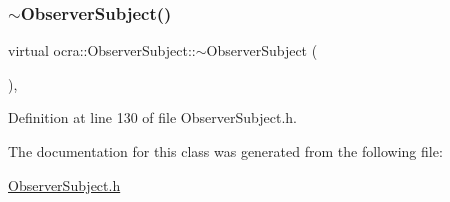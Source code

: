 \subsubsection{\texorpdfstring{$\sim$\+Observer\+Subject()}{~ObserverSubject()}}
{\footnotesize\ttfamily virtual ocra\+::\+Observer\+Subject\+::$\sim$\+Observer\+Subject (\begin{DoxyParamCaption}{ }\end{DoxyParamCaption})\hspace{0.3cm}{\ttfamily [inline]}, {\ttfamily [virtual]}}



Definition at line 130 of file Observer\+Subject.\+h.



The documentation for this class was generated from the following file\+:\begin{DoxyCompactItemize}
\item 
\hyperlink{ObserverSubject_8h}{Observer\+Subject.\+h}\end{DoxyCompactItemize}
